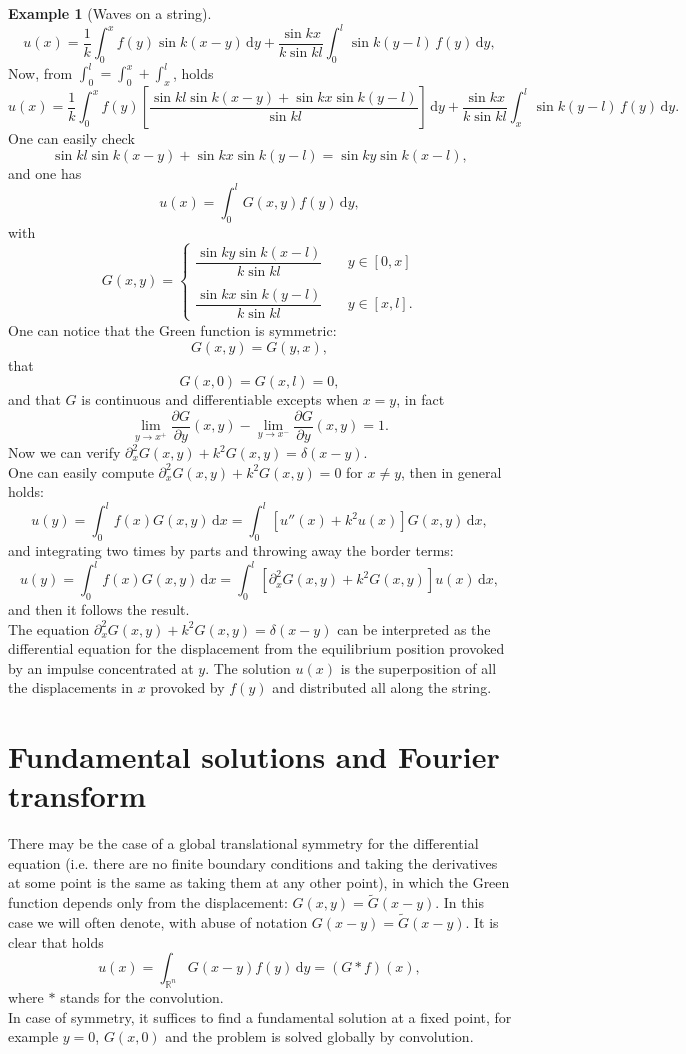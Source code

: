 \documentclass[a4paper,11pt]{article}	%
\theoremstyle{classicthm}
\theoremstyle{definition}
\theoremstyle{definition}
\newtheorem{example}[theorem]{Example}
\newenvironment{esempio}{\begin{example}}{
	\end{example}}
\def\mR{{\mathbb R}}
\newcommand{\parz}[2]{\displaystyle \frac{\partial #1}{\partial #2}}
\newcommand{\dd}{\mathrm d}
\begin{document}
\begin{esempio}[Waves on a string]
	\[	u(x)=\frac1k \int_{0}^{x}f(y)\sin k(x-y)\,\dd y+\frac{\sin kx}{k\sin kl}\int_{0}^{l}\sin  k(y-l)\,f(y)\,\dd y,		\]
	Now, from $\int_{0}^{l}=\int_{0}^{x}+\int_{x}^{l}$, holds
	\[	u(x)=\frac1k \int_{0}^{x}f(y)\left[\frac{\sin kl\sin k(x-y)+\sin kx\sin k(y-l)}{\sin kl}\right]\,\dd y+\frac{\sin kx}{k\sin kl}\int_{x}^{l}\sin  k(y-l)\,f(y)\,\dd y.	\]
	One can easily check $$\sin kl\sin k(x-y)+\sin kx\sin k(y-l)=\sin ky\sin k(x-l),$$ and one has
	\begin{equation}
			u(x)=	\int_0^l G(x,y)f(y)\,\dd y,
	\end{equation}
	with
	\[	G(x,y)=\begin{cases}
	\dfrac{\sin ky\sin k(x-l)}{k\sin kl}\quad& y\in[0,x]\\
	\\
	\dfrac{\sin kx\sin k(y-l)}{k\sin kl}\quad& y\in[x,l].
	\end{cases}		\]
	One can notice that the Green function is symmetric: $$G(x,y)=G(y,x),$$ that $$G(x,0)=G(x,l)=0,$$ and that $G$ is continuous and differentiable excepts when $x=y$, in fact
	\[	\lim_{y\to x^+}\parz{G}{y}(x,y)-\lim_{y\to x^-}\parz{G}{y}(x,y)=1.	\]
	Now we can verify $\partial_x^2G(x,y)+k^2G(x,y)=\delta(x-y)$.\\
	One can easily compute $\partial_x^2G(x,y)+k^2G(x,y)=0$ for $x\neq y$, then in general holds:
	\[	u(y)=\int_{0}^{l}f(x)G(x,y)\,\dd x=\int_{0}^{l}\left[u''(x)+k^2u(x)\right]G(x,y)\,\dd x,		\]
	and integrating two times by parts and throwing away the border terms:
	\[	u(y)=\int_{0}^{l}f(x)G(x,y)\,\dd x=\int_{0}^{l}\left[\partial_x^2 G(x,y)+k^2G(x,y)\right]u(x)\,\dd x,		\]
	and then it follows the result.\\
	The equation $\partial_x^2G(x,y)+k^2G(x,y)=\delta(x-y)$ can be interpreted as the differential equation for the displacement from the equilibrium position provoked by an impulse concentrated at $y$. The solution $u(x)$ is the superposition of all the displacements in $x$ provoked by $f(y)$ and distributed all along the string.
\end{esempio}

\section{Fundamental solutions and Fourier transform}

	There may be the case of a global translational symmetry for the differential equation (i.e. there are no finite boundary conditions and taking the derivatives at some point is the same as taking them at any other point), in which the Green function depends only from the displacement: $G(x,y)=\widetilde{G}(x-y)$. In this case we will often denote, with abuse of notation  $G(x-y)=\widetilde{G}(x-y)$. It is clear that holds
	\begin{equation}
	u(x)=\int_{\mR^n} G(x-y)f(y)\,\dd y=(G*f)(x),\label{eq:convolution}
	\end{equation}
	where $*$ stands for the convolution.\\
	In case of symmetry, it suffices to find a fundamental solution at a fixed point, for example $y=0$, $G(x,0)$ and the problem is solved globally by convolution.
\end{document}
